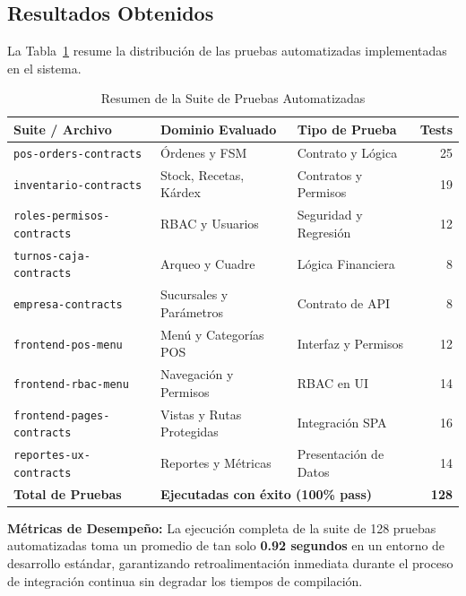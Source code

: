 \subsection{Resultados Obtenidos}

La Tabla~\ref{tab:resultados_pruebas} resume la distribución de las pruebas automatizadas implementadas en el sistema.

\begin{table}[htbp]
\caption{Resumen de la Suite de Pruebas Automatizadas}
\label{tab:resultados_pruebas}
\begin{tabularx}{\columnwidth}{lXXr}
\toprule
\textbf{Suite / Archivo} & \textbf{Dominio Evaluado} & \textbf{Tipo de Prueba} & \textbf{Tests} \\
\midrule
\texttt{pos-orders-contracts} & Órdenes y FSM & Contrato y Lógica & 25 \\
\texttt{inventario-contracts} & Stock, Recetas, Kárdex & Contratos y Permisos & 19 \\
\texttt{roles-permisos-contracts} & RBAC y Usuarios & Seguridad y Regresión & 12 \\
\texttt{turnos-caja-contracts} & Arqueo y Cuadre & Lógica Financiera & 8 \\
\texttt{empresa-contracts} & Sucursales y Parámetros & Contrato de API & 8 \\
\texttt{frontend-pos-menu} & Menú y Categorías POS & Interfaz y Permisos & 12 \\
\texttt{frontend-rbac-menu} & Navegación y Permisos & RBAC en UI & 14 \\
\texttt{frontend-pages-contracts} & Vistas y Rutas Protegidas & Integración SPA & 16 \\
\texttt{reportes-ux-contracts} & Reportes y Métricas & Presentación de Datos & 14 \\
\midrule
\textbf{Total de Pruebas} & \multicolumn{2}{l}{\textbf{Ejecutadas con éxito (100\% pass)}} & \textbf{128} \\
\bottomrule
\end{tabularx}
\end{table}

\textbf{Métricas de Desempeño:} La ejecución completa de la suite de 128 pruebas automatizadas toma un promedio de tan solo \textbf{0.92 segundos} en un entorno de desarrollo estándar, garantizando retroalimentación inmediata durante el proceso de integración continua sin degradar los tiempos de compilación.
